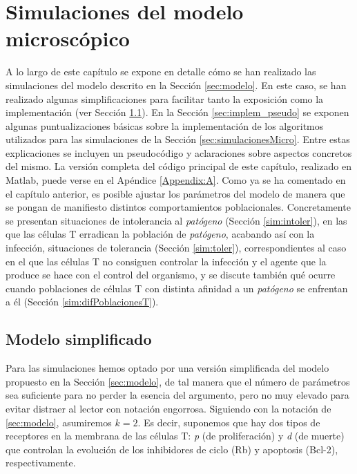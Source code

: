
\chapter{Simulaciones del modelo microscópico}
\label{cap:simulaciones}

A lo largo de este capítulo se expone en detalle cómo se han realizado las simulaciones del modelo descrito en la Sección \ref{sec:modelo}. En este caso, se han realizado algunas simplificaciones para facilitar tanto la exposición como la implementación (ver Sección \ref{sec:modelo_simplif}). En la Sección \ref{sec:implem_pseudo} se exponen algunas puntualizaciones básicas sobre la implementación de los algoritmos utilizados para las simulaciones de la Sección \ref{sec:simulacionesMicro}. Entre estas explicaciones se incluyen un pseudocódigo y aclaraciones sobre aspectos concretos del mismo. La versión completa del código principal de este capítulo, realizado en Matlab, puede verse en el Apéndice \ref{Appendix:A}. Como ya se ha comentado en el capítulo anterior, es posible ajustar los parámetros del modelo de manera que se pongan de manifiesto distintos comportamientos poblacionales. Concretamente se presentan situaciones de intolerancia al \textit{patógeno} (Sección \ref{sim:intoler}), en las que las células T erradican la población de \textit{patógeno}, acabando así con la infección, situaciones de tolerancia (Sección \ref{sim:toler}), correspondientes al caso en el que las células T no consiguen controlar la infección y el agente que la produce se hace con el control del organismo, y se discute también qué ocurre cuando poblaciones de células T con distinta afinidad a un \textit{patógeno} se enfrentan a él (Sección \ref{sim:difPoblacionesT}).


\section{Modelo simplificado}
\label{sec:modelo_simplif}

Para las simulaciones hemos optado por una versión simplificada del modelo propuesto en la Sección \ref{sec:modelo}, de tal manera que el número de parámetros sea suficiente para no perder la esencia del argumento, pero no muy elevado para evitar distraer al lector con notación engorrosa. Siguiendo con la notación de \ref{sec:modelo}, asumiremos $k=2$. Es decir, suponemos que hay dos tipos de receptores en la membrana de las células T: \textit{p} (de proliferación) y \textit{d} (de muerte) que controlan la evolución de los inhibidores de ciclo (Rb) y apoptosis (Bcl-2), respectivamente.

